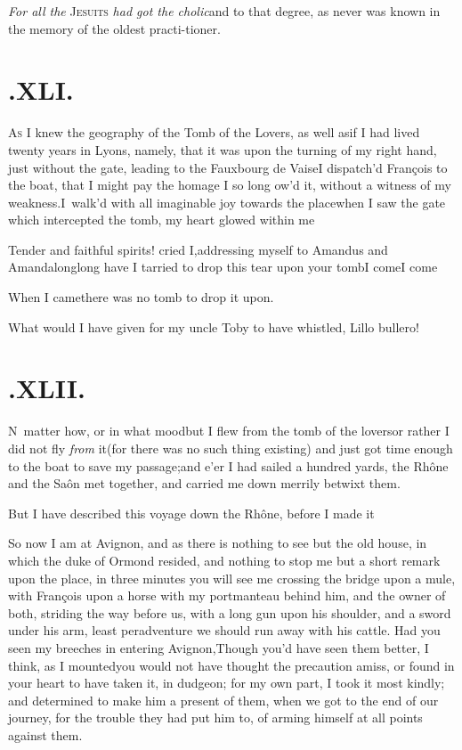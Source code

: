 \documentclass{article}
\begin{document}
\textit{For all the} \textsc{Jesuits} \textit{had got the
cholic}\break\tsk and to that degree, as never was known in the
memory of the oldest practi-\break tioner.

\section{.\enspace XLI.}

\lettrine{A}{\!s} I knew the geography of the Tomb of the
Lovers, as well as\break if I had lived twenty years in Lyons, namely,
that it was upon the turning of my right hand, just without the
gate, leading to the Fauxbourg de Vaise\tsk I dispatch’d
François to the boat, that I might pay the homage I so long ow’d
it, without a witness of my weakness.\tsk I~walk’d with all
imaginable joy towards the place\tsk when I saw the gate which
intercepted the tomb, my heart glowed\break
within me\tsh{}

\tsk Tender and faithful spirits! cried I,\break addressing myself
to Amandus and Amanda\tsk long\tsk long have I
tarried to drop this tear upon your tomb\tsh I
come\tsh I come\tsh

\vskip -2pt

When I came\tsk there was no tomb to drop it upon.

\vskip -2pt

What would I have given for my uncle Toby to have
whistled, Lillo bullero!

\vskip -2pt

\section{.\enspace XLII.}

\lettrine{N}{\,} matter how, or in what
mood\tsk\break but I flew from the tomb of the lovers\tsk or rather I
did not fly \textit{from} it\tsk (for there was no such thing
existing) and just got time enough to the boat to save my
passage;\tsk and e’er I had sailed a hundred yards, the
Rhône and the Saôn met together, and
carried me down merrily betwixt them.\etp{}

But I have described this voyage down the Rhône,
before I made it\tsh

\tsh So now I am at Avignon, and as there is
nothing to see but the old house, in which the duke of
Ormond resided, and nothing to stop me but a short remark
upon the place, in three minutes you will see me crossing the
bridge upon a mule, with François upon a horse with
my portmanteau behind him, and the owner of both, striding the way
before us, with a long gun upon his shoulder, and a sword under his
arm, least peradventure we should run away with his cattle. Had you
seen my breeches in entering Avignon,\tsh Though
you’d have seen them better, I think, as I mounted\tsk you
would not have thought the precaution amiss, or found in your heart
to have taken it, in dudgeon; for my own part, I took it most
kindly; and determined to make him a present of them, when we got
to the end of our journey, for the trouble they had put him to, of
arming himself at all points against them.
\end{document}

